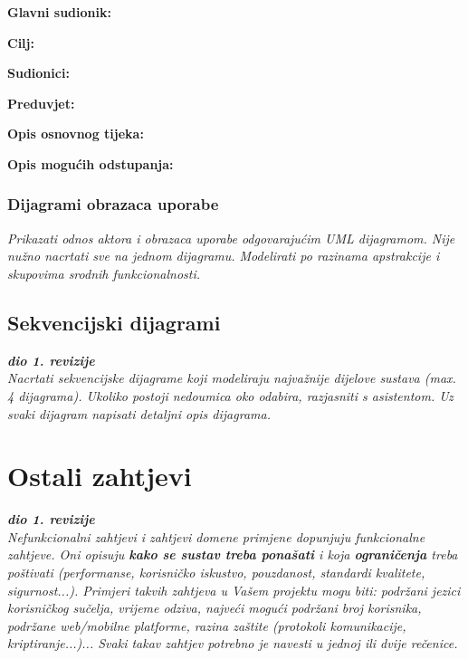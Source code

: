 				
					\noindent {}
					\begin{packed_item}
						\item \textbf{Glavni sudionik: }
						\item  \textbf{Cilj:}
						\item  \textbf{Sudionici:}
						\item  \textbf{Preduvjet:}
						
						\item  \textbf{Opis osnovnog tijeka:}
						\item[] \begin{packed_enum}
						\end{packed_enum}
						
						\item  \textbf{Opis mogućih odstupanja:}
						\item[] \begin{packed_item}							
						\end{packed_item}
					\end{packed_item}
					
					
					
				\subsubsection{Dijagrami obrazaca uporabe}
					
					\textit{Prikazati odnos aktora i obrazaca uporabe odgovarajućim UML dijagramom. Nije nužno nacrtati sve na jednom dijagramu. Modelirati po razinama apstrakcije i skupovima srodnih funkcionalnosti.}
				\eject		
				
			\subsection{Sekvencijski dijagrami}
				
				\textbf{\textit{dio 1. revizije}}\\
				
				\textit{Nacrtati sekvencijske dijagrame koji modeliraju najvažnije dijelove sustava (max. 4 dijagrama). Ukoliko postoji nedoumica oko odabira, razjasniti s asistentom. Uz svaki dijagram napisati detaljni opis dijagrama.}
				\eject
	
		\section{Ostali zahtjevi}
		
			\textbf{\textit{dio 1. revizije}}\\
		 
			 \textit{Nefunkcionalni zahtjevi i zahtjevi domene primjene dopunjuju funkcionalne zahtjeve. Oni opisuju \textbf{kako se sustav treba ponašati} i koja \textbf{ograničenja} treba poštivati (performanse, korisničko iskustvo, pouzdanost, standardi kvalitete, sigurnost...). Primjeri takvih zahtjeva u Vašem projektu mogu biti: podržani jezici korisničkog sučelja, vrijeme odziva, najveći mogući podržani broj korisnika, podržane web/mobilne platforme, razina zaštite (protokoli komunikacije, kriptiranje...)... Svaki takav zahtjev potrebno je navesti u jednoj ili dvije rečenice.}
			 
			 
			 
	